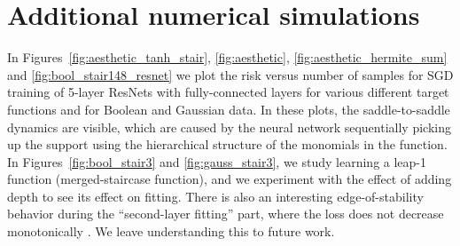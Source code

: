 \documentclass[11pt]{article}
\newcommand{\<}{\langle}
\renewcommand{\>}{\rangle}
\theoremstyle{definition}
\begin{document}








\clearpage












\appendix


\section{Additional numerical simulations}\label{app:experiments}


In Figures~\ref{fig:aesthetic_tanh_stair}, \ref{fig:aesthetic}, \ref{fig:aesthetic_hermite_sum} and \ref{fig:bool_stair148_resnet} we plot the risk versus number of samples for SGD training of 5-layer ResNets with fully-connected layers for various different target functions and for Boolean and Gaussian data. In these plots, the saddle-to-saddle dynamics are visible, which are caused by the neural network sequentially picking up the support using the hierarchical structure of the monomials in the function. In Figures~\ref{fig:bool_stair3} and \ref{fig:gauss_stair3}, we study learning a leap-1 function (merged-staircase function), and we experiment with the effect of adding depth to see its effect on fitting. There is also an interesting edge-of-stability behavior during the ``second-layer fitting'' part, where the loss does not decrease monotonically \citep{cohen2021gradient}. We leave understanding this to future work.
\end{document}
